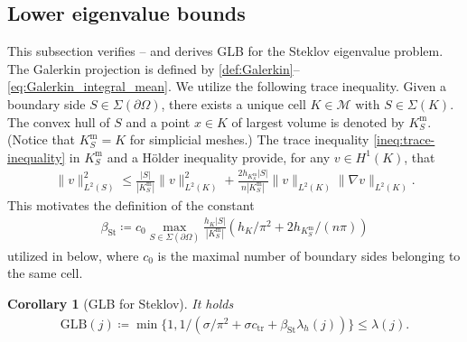 \documentclass[a4paper]{amsart}
\numberwithin{equation}{section}
\newcommand{\Mcal}{\mathcal{M}}
\newtheorem{corollary}[theorem]{Corollary}
\theoremstyle{remark}
\theoremstyle{definition}
\theoremstyle{assumptionnoperiod}
\begin{document}
\subsection{Lower eigenvalue bounds}
This subsection verifies -- and derives GLB for the Steklov eigenvalue problem.
The Galerkin projection is defined by \eqref{def:Galerkin}--\eqref{eq:Galerkin_integral_mean}.
We utilize the following trace inequality. Given a boundary side $S \in \Sigma(\partial \Omega)$,
there exists a unique cell $K \in \Mcal$ with $S \in \Sigma(K)$.
The convex hull of $S$ and a point $x \in K$ of largest volume is denoted by $K^\mathrm{m}_S$.
(Notice that $K_S^\mathrm{m} = K$ for simplicial meshes.)
The trace inequality \eqref{ineq:trace-inequality} in $K_S^\mathrm{m}$ and a H\"older inequality provide, for any $v \in H^1(K)$, that
\begin{align}\label{ineq:trace-2}
	\|v\|_{L^2(S)}^2 \leq \frac{|S|}{|K_S^\mathrm{m}|} \|v\|_{L^2(K)}^2 + \frac{2 h_{K_S^\mathrm{m}}|S|}{n|K_S^\mathrm{m}|}\|v\|_{L^2(K)} \|\nabla v\|_{L^2(K)}.
\end{align}
This motivates the definition of the constant
\begin{align}\label{def:beta-st}
	\beta_\mathrm{St} \coloneqq c_\mathrm{0} \max_{S \in \Sigma(\partial \Omega)} \frac{h_K|S|}{|K_S^\mathrm{m}|}(h_K/\pi^2 + 2h_{K_S^\mathrm{m}}/(n\pi))
\end{align}
utilized in  below, where $c_0$ is the maximal number of boundary sides belonging to the same cell.

\begin{corollary}[GLB for Steklov]\label{cor:Steklov}
	It holds
	\begin{align}
		\mathrm{GLB}(j) \coloneqq \min\{1, 1/(\sigma/\pi^2 + \sigma c_\mathrm{tr} + \beta_\mathrm{St} \lambda_h(j))\} \leq \lambda(j).
	\end{align}
\end{corollary}
\end{document}
